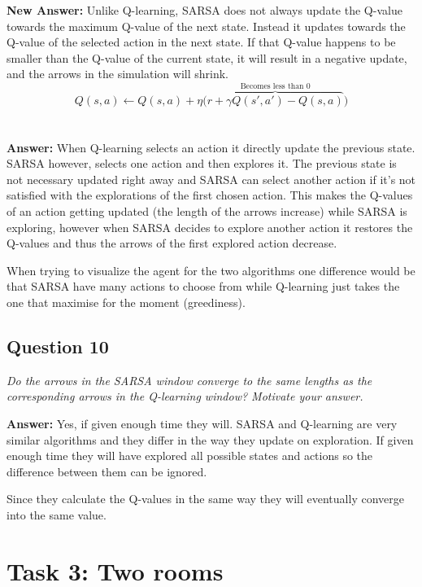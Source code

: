 \documentclass[a4paper]{article}
\begin{document}
\textbf{New Answer:} Unlike Q-learning, SARSA does not always update the
Q-value towards the maximum Q-value of the next state. Instead it updates
towards the Q-value of the selected action in the next state. If that Q-value
happens to be smaller than the Q-value of the current state, it will result in
a negative update, and the arrows in the simulation will shrink.
\begin{equation*}
Q(s, a) \leftarrow Q(s, a) + \eta \bigg(\overbrace{ r + \gamma Q(s', a') - 
Q(s, a)}^\text{Becomes less than 0} \bigg)
\end{equation*}
\\\\
\textbf{Answer:} When Q-learning selects an action it directly update the 
previous state. SARSA however, selects one action and then explores it. 
The previous state is not necessary updated right away and SARSA can 
select another action if it's not satisfied with the explorations of the 
first chosen action. This makes the Q-values of an action getting updated 
(the length of the arrows increase) while SARSA is exploring, however when 
SARSA decides to explore another action it restores the Q-values and thus 
the arrows of the first explored action decrease.

When trying to visualize the agent for the two algorithms one difference 
would be that SARSA have many actions to choose from while Q-learning 
just takes the one that maximise for the moment (greediness).

\subsection*{Question 10}
\emph{Do the arrows in the SARSA window converge to the same
lengths as the corresponding arrows in the Q-learning window? Motivate your answer.}

\textbf{Answer:} Yes, if given enough time they will. SARSA and Q-learning are very similar algorithms and they differ in the way they update on exploration. If given enough time they will have explored all possible states and actions so the difference between them can be ignored. 

Since they calculate the Q-values in the same way they will eventually converge into the same value.

\section{Task 3: Two rooms}
\end{document}
